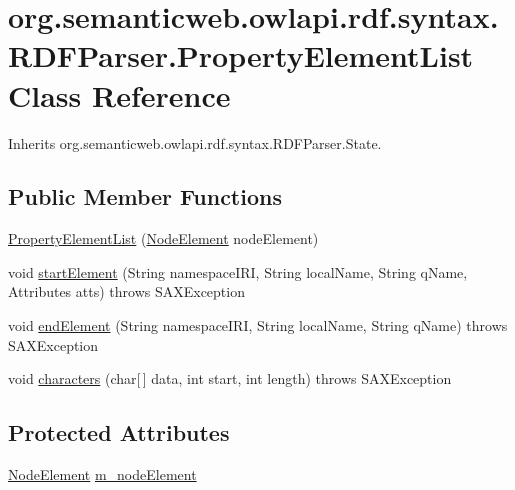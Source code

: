 \hypertarget{classorg_1_1semanticweb_1_1owlapi_1_1rdf_1_1syntax_1_1_r_d_f_parser_1_1_property_element_list}{\section{org.\-semanticweb.\-owlapi.\-rdf.\-syntax.\-R\-D\-F\-Parser.\-Property\-Element\-List Class Reference}
\label{classorg_1_1semanticweb_1_1owlapi_1_1rdf_1_1syntax_1_1_r_d_f_parser_1_1_property_element_list}
}


Inherits org.\-semanticweb.\-owlapi.\-rdf.\-syntax.\-R\-D\-F\-Parser.\-State.

\subsection*{Public Member Functions}
\begin{DoxyCompactItemize}
\item 
\hyperlink{classorg_1_1semanticweb_1_1owlapi_1_1rdf_1_1syntax_1_1_r_d_f_parser_1_1_property_element_list_a6a08393ec44ffbdcd15999e5f3fb150b}{Property\-Element\-List} (\hyperlink{classorg_1_1semanticweb_1_1owlapi_1_1rdf_1_1syntax_1_1_r_d_f_parser_1_1_node_element}{Node\-Element} node\-Element)
\item 
void \hyperlink{classorg_1_1semanticweb_1_1owlapi_1_1rdf_1_1syntax_1_1_r_d_f_parser_1_1_property_element_list_a0147fcb76eb385c10905db071eee28e4}{start\-Element} (String namespace\-I\-R\-I, String local\-Name, String q\-Name, Attributes atts)  throws S\-A\-X\-Exception 
\item 
void \hyperlink{classorg_1_1semanticweb_1_1owlapi_1_1rdf_1_1syntax_1_1_r_d_f_parser_1_1_property_element_list_af31d526d6a807979cf53a69c949e0a0f}{end\-Element} (String namespace\-I\-R\-I, String local\-Name, String q\-Name)  throws S\-A\-X\-Exception 
\item 
void \hyperlink{classorg_1_1semanticweb_1_1owlapi_1_1rdf_1_1syntax_1_1_r_d_f_parser_1_1_property_element_list_aa6bd8674a0d6157060ce305b7c07318d}{characters} (char\mbox{[}$\,$\mbox{]} data, int start, int length)  throws S\-A\-X\-Exception 
\end{DoxyCompactItemize}
\subsection*{Protected Attributes}
\begin{DoxyCompactItemize}
\item 
\hyperlink{classorg_1_1semanticweb_1_1owlapi_1_1rdf_1_1syntax_1_1_r_d_f_parser_1_1_node_element}{Node\-Element} \hyperlink{classorg_1_1semanticweb_1_1owlapi_1_1rdf_1_1syntax_1_1_r_d_f_parser_1_1_property_element_list_ad793123360a2bfcda74864ddd9e4e7cb}{m\-\_\-node\-Element}
\end{DoxyCompactItemize}


